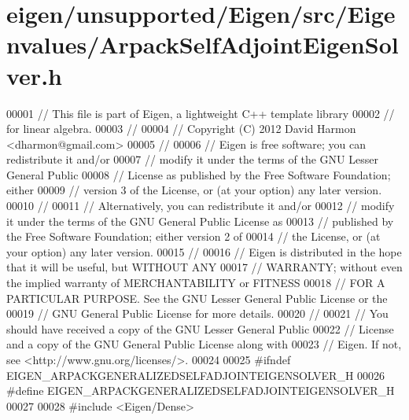 \hypertarget{eigen_2unsupported_2_eigen_2src_2_eigenvalues_2_arpack_self_adjoint_eigen_solver_8h_source}{}\section{eigen/unsupported/\+Eigen/src/\+Eigenvalues/\+Arpack\+Self\+Adjoint\+Eigen\+Solver.h}
\label{eigen_2unsupported_2_eigen_2src_2_eigenvalues_2_arpack_self_adjoint_eigen_solver_8h_source}

\begin{DoxyCode}
00001 \textcolor{comment}{// This file is part of Eigen, a lightweight C++ template library}
00002 \textcolor{comment}{// for linear algebra.}
00003 \textcolor{comment}{//}
00004 \textcolor{comment}{// Copyright (C) 2012 David Harmon <dharmon@gmail.com>}
00005 \textcolor{comment}{//}
00006 \textcolor{comment}{// Eigen is free software; you can redistribute it and/or}
00007 \textcolor{comment}{// modify it under the terms of the GNU Lesser General Public}
00008 \textcolor{comment}{// License as published by the Free Software Foundation; either}
00009 \textcolor{comment}{// version 3 of the License, or (at your option) any later version.}
00010 \textcolor{comment}{//}
00011 \textcolor{comment}{// Alternatively, you can redistribute it and/or}
00012 \textcolor{comment}{// modify it under the terms of the GNU General Public License as}
00013 \textcolor{comment}{// published by the Free Software Foundation; either version 2 of}
00014 \textcolor{comment}{// the License, or (at your option) any later version.}
00015 \textcolor{comment}{//}
00016 \textcolor{comment}{// Eigen is distributed in the hope that it will be useful, but WITHOUT ANY}
00017 \textcolor{comment}{// WARRANTY; without even the implied warranty of MERCHANTABILITY or FITNESS}
00018 \textcolor{comment}{// FOR A PARTICULAR PURPOSE. See the GNU Lesser General Public License or the}
00019 \textcolor{comment}{// GNU General Public License for more details.}
00020 \textcolor{comment}{//}
00021 \textcolor{comment}{// You should have received a copy of the GNU Lesser General Public}
00022 \textcolor{comment}{// License and a copy of the GNU General Public License along with}
00023 \textcolor{comment}{// Eigen. If not, see <http://www.gnu.org/licenses/>.}
00024 
00025 \textcolor{preprocessor}{#ifndef EIGEN\_ARPACKGENERALIZEDSELFADJOINTEIGENSOLVER\_H}
00026 \textcolor{preprocessor}{#define EIGEN\_ARPACKGENERALIZEDSELFADJOINTEIGENSOLVER\_H}
00027 
00028 \textcolor{preprocessor}{#include <Eigen/Dense>}

\end{DoxyCode}
